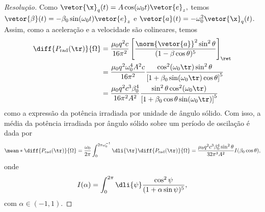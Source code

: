\begin{proof}[Resolução]
    Como \(\vetor{\x}_q(t) = A \cos(\omega_0 t) \vetor{e}_z,\) temos \(\vetor{\beta}(t) = -\beta_0 \sin(\omega_0 t) \vetor{e}_z\) e \(\vetor{a}(t) = - \omega_0^2 \vetor{\x}_q(t)\). Assim, como a aceleração e a velocidade são colineares, temos
    \begin{align*}
        \diff{P_{\mathrm{rad}}(\tr)}{\Omega} &= \frac{\mu_0 q^2 c }{16 \pi^2}\left[\frac{\norm{\vetor{a}}^2\sin^2\theta}{(1 - \beta\cos\theta)^5}\right]_\ret\\
                                             &= \frac{\mu_0 q^2 \omega_0^4 A^2 c}{16 \pi^2}\frac{\cos^2(\omega_0\tr) \sin^2\theta}{\left[1 + \beta_0 \sin(\omega_0\tr) \cos\theta\right]^5}\\
                                             &= \frac{\mu_0 q^2 c^3 \beta_0^4}{16 \pi^2 A^2} \frac{\sin^2\theta \cos^2(\omega_0 \tr)}{\left[1 + \beta_0 \cos\theta \sin(\omega_0 \tr)\right]^5}
    \end{align*}
    como a expressão da potência irradiada por unidade de ângulo sólido. Com isso, a média da potência irradiada por ângulo sólido sobre um período de oscilação é dada por
    \begin{equation*}
        \mean*{\diff{P_\mathrm{rad}(\tr)}{\Omega}} = \frac{\omega_0}{2\pi} \int_0^{2\pi \omega_0^{-1}} \dli{\tr} \diff{P_\mathrm{rad}(\tr)}{\Omega} = \frac{\mu_0 q^2 c^3 \beta_0^4\sin^2\theta}{32 \pi^3 A^2} I(\beta_0 \cos\theta),
    \end{equation*}
    onde 
    \begin{equation*}
        I(\alpha) = \int_{0}^{2\pi} \dli{\psi} \frac{\cos^2\psi}{(1 + \alpha \sin \psi)^5},
    \end{equation*}
    com \(\alpha \in (-1,1).\) 


\end{proof}

